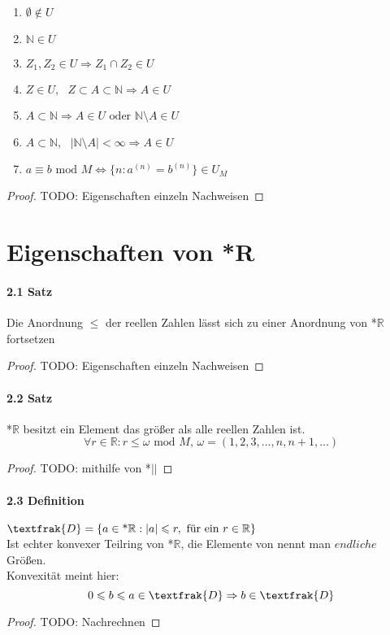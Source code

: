 \documentclass[a4paper]{article}
\begin{document}
\begin{enumerate}
      \item $ \emptyset \notin U $      
      \item $ \mathbb{N} \in U$ 
      \item $ Z_1, Z_2 \in U \Rightarrow Z_1 \cap Z_2 \in U$ 
      \item $ Z \in U, \text{ } Z \subset A \subset \mathbb{N} \Rightarrow A \in U$ 
      \item $ A \subset  \mathbb{N} \Rightarrow A \in U \text{ oder } \mathbb{N} \setminus A \in U$ 
      \item $ A \subset  \mathbb{N}, \text{ } |\mathbb{N} \setminus A| < \infty \Rightarrow A \in U$ 
      \item $a \equiv b \text{ mod } M \iff \{n: a^{(n)} = b^{(n)}\} \in U_M$
\end{enumerate}
\begin{proof}
      TODO: Eigenschaften einzeln Nachweisen
\end{proof}


\section{Eigenschaften von *R}

\paragraph{2.1 Satz} Die Anordnung $\leqslant$ der reellen Zahlen lässt 
sich zu einer Anordnung von *$\mathbb{R}$ fortsetzen
\begin{proof}
      TODO: Eigenschaften einzeln Nachweisen
\end{proof}

\paragraph{2.2 Satz} *$\mathbb{R}$ besitzt ein Element das größer als alle reellen Zahlen ist. 
$$ \forall r \in \mathbb{R} : r \leqslant \omega \text{ mod } M \text{, } \omega = (1,2,3,...,n,n+1,...) $$
\begin{proof}
      TODO: mithilfe von *$| | $ 
\end{proof}

\paragraph{2.3 Definition} $ \textfrak{D} = \{a \in \text{*}\mathbb{R}: |a| \leqslant r, \text{ für ein } r \in \mathbb{R}\} $ \\
Ist echter konvexer Teilring von *$\mathbb{R}$, die Elemente von  nennt man $ endliche $ Größen. \\
Konvexität meint hier:
$$ 0 \leqslant b \leqslant a \in \textfrak{D} \Rightarrow b \in \textfrak{D} $$
\begin{proof}
      TODO: Nachrechnen
\end{proof}
\end{document}
